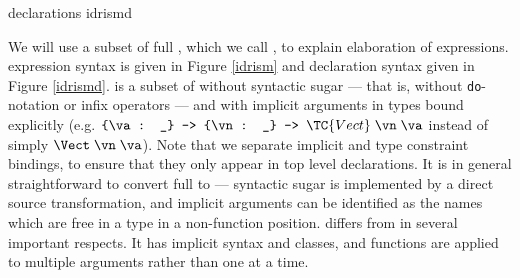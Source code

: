 {\IdrisM{} declarations}
{idrismd}

We will use a subset of full \Idris{}, which we call \IdrisM{}, to explain
elaboration of expressions. \IdrisM{} expression syntax is given in Figure
\ref{idrism} and declaration syntax given in Figure \ref{idrismd}.
\IdrisM{} is a subset of \Idris{} without syntactic sugar --- that is, without
\texttt{do}-notation or infix operators --- and with implicit
arguments in types bound explicitly 
(e.g. $\piimp{\va}{\_}\piimp{\vn}{\_}\TC{Vect}\;\vn\;\va$
instead of simply $\Vect\;\vn\;\va$).
Note that we separate implicit and type constraint bindings, to ensure that they
only appear in top level declarations.
It is in general straightforward to
convert full \Idris{} to \IdrisM{} --- syntactic sugar is implemented by a
direct source transformation, and implicit arguments can be identified as the names
which are free in a type in a non-function position.
%
\IdrisM{} differs from \TT{} in several important respects. It has implicit
syntax and classes, and functions are applied to multiple arguments rather
than one at a time. 

